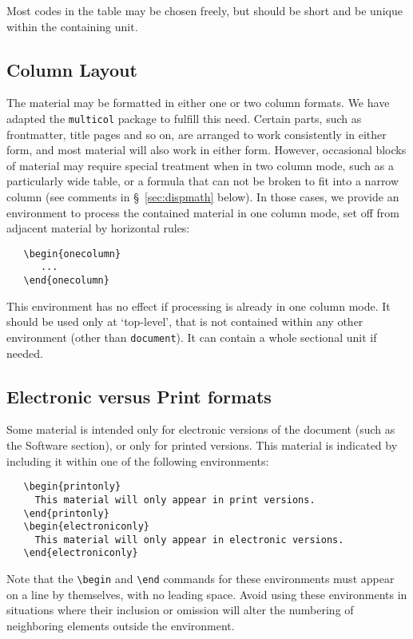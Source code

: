 \documentclass[twoside]{article}
\newcommand{\package}[1]{\texttt{#1}}
\newcommand{\token}[1]{\texttt{#1}}
\begin{document}
Most codes in the table may be chosen freely, but should be short
and be unique within the containing unit.

\subsection{Column Layout}\label{sec:columns}
The material may be formatted in either one or two column formats.  
We have adapted the \package{multicol} package to fulfill this need.
Certain parts, such as frontmatter, title pages and so on, are arranged to
work consistently in either form, and most material will also work in either form.
However, occasional blocks of material may require special treatment
when in two column mode,  such as a particularly wide table, or a formula 
that can not be broken to fit into a narrow column (see comments in
\S~\ref{sec:dispmath} below).
In those cases, we provide an environment to process the contained
material in one column mode, set off from adjacent material by horizontal
rules:
\begin{verbatim}
   \begin{onecolumn}
      ...
   \end{onecolumn}
\end{verbatim}
This environment has no effect if processing is already in one column mode.
It should be used only at `top-level', that is not contained within any other
environment (other than \token{document}).  It can contain a whole sectional unit
if needed.

\subsection{Electronic versus Print formats}\label{sec:exclude}
Some material is intended only for electronic versions of the document
(such as the Software section), or only for printed versions.  This material
is indicated by including it within one of the following environments:
\begin{verbatim}
   \begin{printonly}
     This material will only appear in print versions.
   \end{printonly}
   \begin{electroniconly}
     This material will only appear in electronic versions.
   \end{electroniconly}
\end{verbatim}
Note that the \verb|\begin| and \verb|\end| commands for these environments
must appear on a line by themselves, with no leading space.
Avoid using these environments in situations where their inclusion or omission
will alter the numbering of neighboring elements outside the environment.
\end{document}
